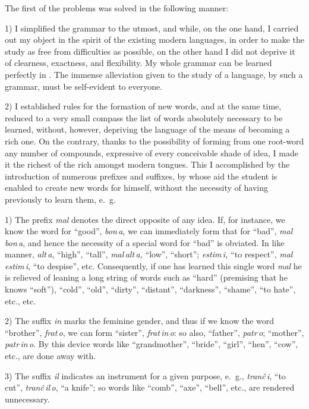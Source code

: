 \documentclass[12pt,twoside]{book}
\begin{document}

The first of the problems was solved in the following manner:

1) I simplified the grammar to the utmost, and while, on the one hand, I carried out my object in the spirit of the existing modern languages, in order to make the study as free from difficulties as possible, on the other hand I did not deprive it of clearness, exactness, and flexibility. My whole grammar can be learned perfectly in . The immense alleviation given to the study of a language, by such a grammar, must be self-evident to everyone.

2) I established rules for the formation of new words, and at the same time, reduced to a very small compass the list of words absolutely necessary to be learned, without, however, depriving the language of the means of becoming a rich one. On the contrary, thanks to the possibility of forming from one root-word any number of compounds, expressive of every conceivable shade of idea, I made it the richest of the rich amongst modern tongues. This I accomplished by the introduction of numerous prefixes and suffixes, by whose aid the student is enabled to create new words for himself, without the necessity of having previously to learn them, e.~g.

1) The prefix \emph{mal} denotes the direct opposite of any idea. If, for instance, we know the word for “good”, \emph{bon\,a}, we can immediately form that for “bad”, \emph{mal\,bon\,a}, and hence the necessity of a special word for “bad” is obviated. In like manner, \emph{alt\,a}, “high”, “tall”, \emph{mal\,alt\,a,} “low”, “short”; \emph{estim\,i,} “to respect”, \emph{mal\,estim\,i}, “to despise”, etc. Consequently, if one has learned this single word \emph{mal} he is relieved of leaning a long string of words such as “hard” (premising that he knows “soft”), “cold”, “old”, “dirty”, “distant”, “darkness”, “shame”, “to hate”, etc., etc.

2) The suffix \emph{in} marks the feminine gender, and thus if we know the word “brother”, \emph{frat\,o}, we can form “sister”, \emph{frat\,in\,o}: so also, “father”, \emph{patr\,o}; “mother”, \emph{patr\,in\,o}. By this device words like “grandmother”, “bride”, “girl”, “hen”, “cow”, etc., are done away with.

3) The suffix \emph{il} indicates an instrument for a given purpose, e.~g., \emph{tranĉ\,i}, “to cut”, \emph{tranĉ\,il\,o}, “a knife”; so words like “comb”, “axe”, “bell”, etc., are rendered unnecessary.
\end{document}
